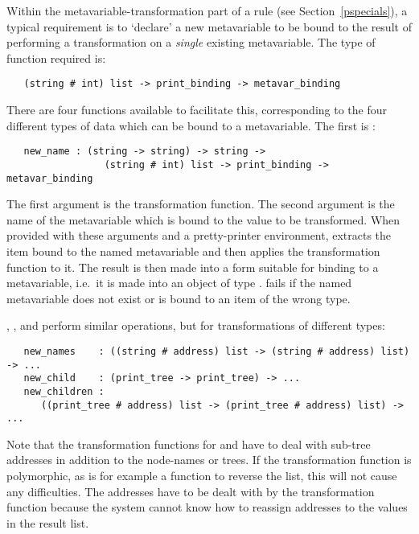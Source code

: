 Within the metavariable-transformation part of a rule (see
Section~\ref{pspecials}), a typical requirement is to `declare' a new
metavariable to be bound to the result of performing a transformation on a
{\em single\/} existing metavariable. The type of function required is:

\begin{small}\begin{verbatim}
   (string # int) list -> print_binding -> metavar_binding
\end{verbatim}\end{small}

\noindent
There are four functions available to facilitate this, corresponding to the
four different types of data which can be bound to a metavariable. The first
is :

\begin{boxed}\begin{verbatim}
   new_name : (string -> string) -> string ->
                 (string # int) list -> print_binding -> metavar_binding
\end{verbatim}\end{boxed}

\noindent
The first argument is the transformation function. The second argument is the
name of the metavariable which is bound to the value to be transformed. When
provided with these arguments and a pretty-printer environment, 
extracts the item bound to the named metavariable and then applies the
transformation function to it. The result is then made into a form suitable
for binding to a metavariable, i.e.~it is made into an object of type
.  fails if the named metavariable does
not exist or is bound to an item of the wrong type.

, , and  perform similar
operations, but for transformations of different types:

\begin{boxed}\begin{verbatim}
   new_names    : ((string # address) list -> (string # address) list) -> ...
   new_child    : (print_tree -> print_tree) -> ...
   new_children :
      ((print_tree # address) list -> (print_tree # address) list) -> ...
\end{verbatim}\end{boxed}

\noindent
Note that the transformation functions for  and
 have to deal with sub-tree addresses in addition to the
node-names or trees. If the transformation function is polymorphic, as is for
example a function to reverse the list, this will not cause any difficulties.
The addresses have to be dealt with by the transformation function because the
system cannot know how to reassign addresses to the values in the result list.
